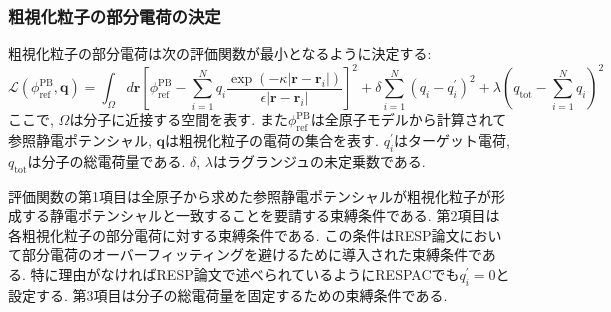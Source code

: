 \subsubsection{粗視化粒子の部分電荷の決定}
粗視化粒子の部分電荷は次の評価関数が最小となるように決定する:
\begin{equation}
    \mathcal{L} (\phi_{\mathrm{ref}}^{\mathrm{PB}}, \bm{q})
    =
    \int_{\Omega} d\bm{r}
    \left[
        \phi_{\mathrm{ref}}^{\mathrm{PB}}
        -
        \sum_{i=1}^{N}
        q_{i}
        \frac{\exp(-\kappa |\bm{r} - \bm{r}_{i}|)}{\epsilon |\bm{r} - \bm{r}_{i}|}
    \right]^{2}
    +
    \delta \sum_{i=1}^{N} (q_{i} - q_{i}^{\prime})^{2}
    +
    \lambda(q_{\mathrm{tot}} - \sum_{i=1}^{N} q_{i})^{2}
    \label{Eq:RESPAC-Evaluation-Function}
\end{equation}
ここで, $\Omega$は分子に近接する空間を表す. また$\phi_{\mathrm{ref}}^{\mathrm{PB}}$は全原子モデルから計算されて参照静電ポテンシャル, $\bm{q}$は粗視化粒子の電荷の集合を表す. $q_{i}^{\prime}$はターゲット電荷, $q_{\mathrm{tot}}$は分子の総電荷量である.
$\delta$, $\lambda$はラグランジュの未定乗数である.

評価関数の第1項目は全原子から求めた参照静電ポテンシャルが粗視化粒子が形成する静電ポテンシャルと一致することを要請する束縛条件である.
第2項目は各粗視化粒子の部分電荷に対する束縛条件である. この条件はRESP論文において部分電荷のオーバーフィッティングを避けるために導入された束縛条件である. 特に理由がなければRESP論文で述べられているようにRESPACでも$q_{i}^{\prime} = 0$と設定する.
第3項目は分子の総電荷量を固定するための束縛条件である.

